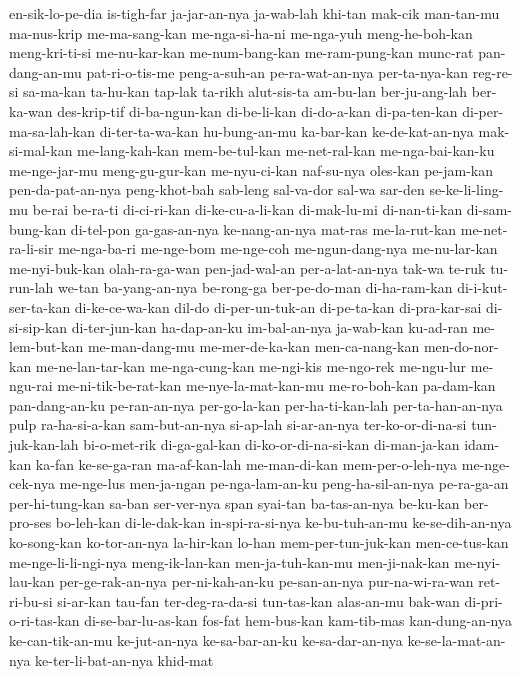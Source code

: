 {en-sik-lo-pe-dia is-tigh-far ja-jar-an-nya ja-wab-lah khi-tan mak-cik man-tan-mu ma-nus-krip
me-ma-sang-kan me-nga-si-ha-ni me-nga-yuh meng-he-boh-kan meng-kri-ti-si me-nu-kar-kan me-num-bang-kan me-ram-pung-kan
munc-rat pan-dang-an-mu pat-ri-o-tis-me peng-a-suh-an pe-ra-wat-an-nya per-ta-nya-kan reg-re-si sa-ma-kan
ta-hu-kan tap-lak ta-rikh alut-sis-ta am-bu-lan ber-ju-ang-lah ber-ka-wan des-krip-tif
di-ba-ngun-kan di-be-li-kan di-do-a-kan di-pa-ten-kan di-per-ma-sa-lah-kan di-ter-ta-wa-kan hu-bung-an-mu ka-bar-kan
ke-de-kat-an-nya mak-si-mal-kan me-lang-kah-kan mem-be-tul-kan me-net-ral-kan me-nga-bai-kan-ku me-nge-jar-mu meng-gu-gur-kan
me-nyu-ci-kan naf-su-nya oles-kan pe-jam-kan pen-da-pat-an-nya peng-khot-bah sab-leng sal-va-dor
sal-wa sar-den se-ke-li-ling-mu be-rai be-ra-ti di-ci-ri-kan di-ke-cu-a-li-kan di-mak-lu-mi
di-nan-ti-kan di-sam-bung-kan di-tel-pon ga-gas-an-nya ke-nang-an-nya mat-ras me-la-rut-kan me-net-ra-li-sir
me-nga-ba-ri me-nge-bom me-nge-coh me-ngun-dang-nya me-nu-lar-kan me-nyi-buk-kan olah-ra-ga-wan pen-jad-wal-an
per-a-lat-an-nya tak-wa te-ruk tu-run-lah we-tan ba-yang-an-nya be-rong-ga ber-pe-do-man
di-ha-ram-kan di-i-kut-ser-ta-kan di-ke-ce-wa-kan dil-do di-per-un-tuk-an di-pe-ta-kan di-pra-kar-sai di-si-sip-kan
di-ter-jun-kan ha-dap-an-ku im-bal-an-nya ja-wab-kan ku-ad-ran me-lem-but-kan me-man-dang-mu me-mer-de-ka-kan
men-ca-nang-kan men-do-nor-kan me-ne-lan-tar-kan me-nga-cung-kan me-ngi-kis me-ngo-rek me-ngu-lur me-ngu-rai
me-ni-tik-be-rat-kan me-nye-la-mat-kan-mu me-ro-boh-kan pa-dam-kan pan-dang-an-ku pe-ran-an-nya per-go-la-kan per-ha-ti-kan-lah
per-ta-han-an-nya pulp ra-ha-si-a-kan sam-but-an-nya si-ap-lah si-ar-an-nya ter-ko-or-di-na-si tun-juk-kan-lah
bi-o-met-rik di-ga-gal-kan di-ko-or-di-na-si-kan di-man-ja-kan idam-kan ka-fan ke-se-ga-ran ma-af-kan-lah
me-man-di-kan mem-per-o-leh-nya me-nge-cek-nya me-nge-lus men-ja-ngan pe-nga-lam-an-ku peng-ha-sil-an-nya pe-ra-ga-an
per-hi-tung-kan sa-ban ser-ver-nya span syai-tan ba-tas-an-nya be-ku-kan ber-pro-ses
bo-leh-kan di-le-dak-kan in-spi-ra-si-nya ke-bu-tuh-an-mu ke-se-dih-an-nya ko-song-kan ko-tor-an-nya la-hir-kan
lo-han mem-per-tun-juk-kan men-ce-tus-kan me-nge-li-li-ngi-nya meng-ik-lan-kan men-ja-tuh-kan-mu men-ji-nak-kan me-nyi-lau-kan
per-ge-rak-an-nya per-ni-kah-an-ku pe-san-an-nya pur-na-wi-ra-wan ret-ri-bu-si si-ar-kan tau-fan ter-deg-ra-da-si
tun-tas-kan alas-an-mu bak-wan di-pri-o-ri-tas-kan di-se-bar-lu-as-kan fos-fat hem-bus-kan kam-tib-mas
kan-dung-an-nya ke-can-tik-an-mu ke-jut-an-nya ke-sa-bar-an-ku ke-sa-dar-an-nya ke-se-la-mat-an-nya ke-ter-li-bat-an-nya khid-mat
}
